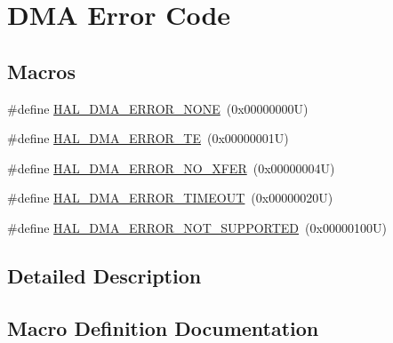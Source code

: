 \hypertarget{group___d_m_a___error___code}{}\section{D\+MA Error Code}
\label{group___d_m_a___error___code}
\subsection*{Macros}
\begin{DoxyCompactItemize}
\item 
\#define \hyperlink{group___d_m_a___error___code_gaad4009390bfbe05a1bb7115d03c25a97}{H\+A\+L\+\_\+\+D\+M\+A\+\_\+\+E\+R\+R\+O\+R\+\_\+\+N\+O\+NE}~(0x00000000\+U)
\item 
\#define \hyperlink{group___d_m_a___error___code_ga9882442c5f8f0170917934bbee1cc92d}{H\+A\+L\+\_\+\+D\+M\+A\+\_\+\+E\+R\+R\+O\+R\+\_\+\+TE}~(0x00000001\+U)
\item 
\#define \hyperlink{group___d_m_a___error___code_gab7526e686427f26bf3b6af062d5a690b}{H\+A\+L\+\_\+\+D\+M\+A\+\_\+\+E\+R\+R\+O\+R\+\_\+\+N\+O\+\_\+\+X\+F\+ER}~(0x00000004\+U)
\item 
\#define \hyperlink{group___d_m_a___error___code_ga6cf6a5b8881ff36ed4316a29bbfb5b79}{H\+A\+L\+\_\+\+D\+M\+A\+\_\+\+E\+R\+R\+O\+R\+\_\+\+T\+I\+M\+E\+O\+UT}~(0x00000020\+U)
\item 
\#define \hyperlink{group___d_m_a___error___code_ga7432f31f9972e1c0a398a3f20587d118}{H\+A\+L\+\_\+\+D\+M\+A\+\_\+\+E\+R\+R\+O\+R\+\_\+\+N\+O\+T\+\_\+\+S\+U\+P\+P\+O\+R\+T\+ED}~(0x00000100\+U)
\end{DoxyCompactItemize}


\subsection{Detailed Description}


\subsection{Macro Definition Documentation}
\mbox{\label{group___d_m_a___error___code_gab7526e686427f26bf3b6af062d5a690b}} 
